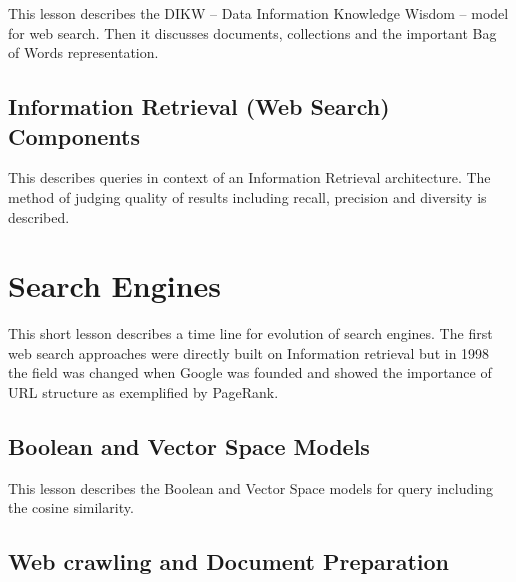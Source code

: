 
This lesson describes the DIKW -- Data Information Knowledge Wisdom --
model for web search. Then it discusses documents, collections and the
important Bag of Words representation.



\subsection{Information Retrieval (Web Search) Components}


This describes queries in context of an Information Retrieval
architecture. The method of judging quality of results including recall,
precision and diversity is described.



\section{Search Engines}\label{search-engines}


This short lesson describes a time line for evolution of search engines.
The first web search approaches were directly built on Information
retrieval but in 1998 the field was changed when Google was founded and
showed the importance of URL structure as exemplified by PageRank.



\subsection{Boolean and Vector Space
Models}\label{boolean-and-vector-space-models}


This lesson describes the Boolean and Vector Space models for query
including the cosine similarity.



\subsection{Web crawling and Document
Preparation}\label{web-crawling-and-document-preparation}

